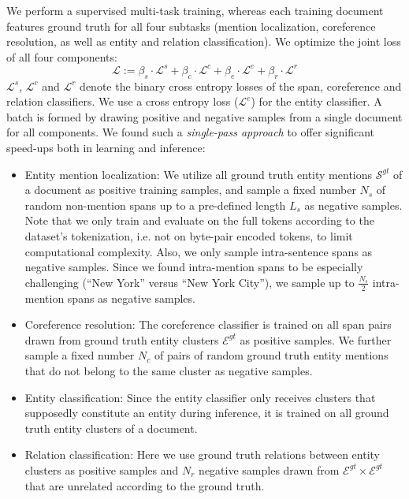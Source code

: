 \documentclass[11pt,a4paper]{article}
\begin{document}
We perform a supervised multi-task training, whereas each training document features ground truth for all four subtasks (mention localization, coreference resolution, as well as entity and relation classification). We optimize the joint loss of all four components:
\begin{equation}
\mathcal{L} := \beta_s \cdot \mathcal{L}^s + \beta_c \cdot \mathcal{L}^c + \beta_e \cdot \mathcal{L}^e + \beta_r \cdot  \mathcal{L}^r
\end{equation}
$\mathcal{L}^s$, $\mathcal{L}^c$ and $\mathcal{L}^r$ denote the binary cross entropy losses of the span, coreference and relation classifiers. We use a cross entropy loss ($\mathcal{L}^e$) for the entity classifier. A batch is formed by drawing positive and negative samples from a single document for all components. We found such a {\it single-pass approach} to offer significant speed-ups both in learning and inference:
\begin{itemize}
    \item Entity mention localization: We utilize all ground truth entity mentions $\mathcal{S}^{gt}$ of a document as positive training samples, and sample a fixed number $N_s$ of random non-mention spans up to a pre-defined length $L_s$ as negative samples. Note that we only train and evaluate on the full tokens according to the dataset's tokenization, i.e. not on byte-pair encoded tokens, to limit computational complexity. Also, we only sample intra-sentence spans as negative samples. Since we found intra-mention spans to be especially challenging (\enquote{New York} versus \enquote{New York City}), we sample up to $\frac{N_s}{2}$ intra-mention spans as negative samples.
    \item Coreference resolution: The coreference classifier is trained on all span pairs drawn from ground truth entity clusters $\mathcal{E}^{gt}$ as positive samples. We further sample a fixed number $N_c$ of pairs of random ground truth entity mentions that do not belong to the same cluster as negative samples. 
    \item Entity classification: Since the entity classifier only receives clusters that supposedly constitute an entity during inference, it is trained on all ground truth entity clusters of a document.
    \item Relation classification: Here we use ground truth relations between entity clusters as positive samples and $N_r$ negative samples drawn from $\mathcal{E}^{gt} {\times} \mathcal{E}^{gt}$ that are unrelated according to the ground truth.
\end{itemize}
\end{document}
